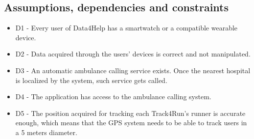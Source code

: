 {\color{secblue}\subsection{Assumptions, dependencies and constraints}}
\begin{itemize}
\item D1 - Every user of Data4Help has a smartwatch or a compatible wearable device.
\item D2 - Data acquired through the users' devices is correct and not manipulated.
\item D3 - An automatic ambulance calling service exists. Once the nearest hospital is localized by the system, such service gets called.
\item D4 - The application has access to the ambulance calling system.
\item D5 - The position acquired for tracking each Track4Run's runner is accurate enough, which means that the GPS system needs to be able to track users in a 5 meters diameter.
\end{itemize}
